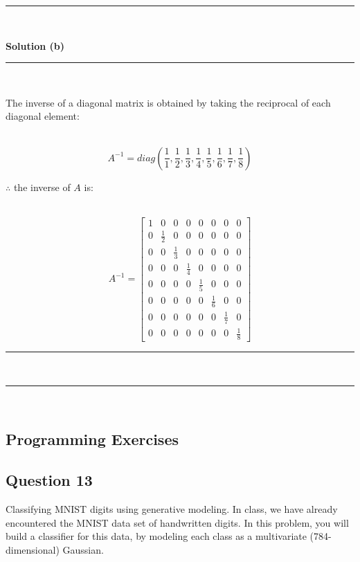 \documentclass{article}
\begin{document}
\noindent\rule{\textwidth}{0.4pt}\\
\parbox{\textwidth}{\textbf{Solution (b)}}
\noindent\rule{\textwidth}{0.4pt}\\
\parbox{\textwidth}{The inverse of a diagonal matrix is obtained by taking the reciprocal of each diagonal element:}\\
$$A^{-1} = diag\left(\frac{1}{1}, \frac{1}{2}, \frac{1}{3}, \frac{1}{4}, \frac{1}{5}, \frac{1}{6}, \frac{1}{7}, \frac{1}{8}\right)$$

\parbox{\textwidth}{$\therefore$ the inverse of $A$ is:}\\
$$A^{-1} = \begin{bmatrix}
    1 & 0 & 0 & 0 & 0 & 0 & 0 & 0 \\
    0 & \frac{1}{2} & 0 & 0 & 0 & 0 & 0 & 0 \\
    0 & 0 & \frac{1}{3} & 0 & 0 & 0 & 0 & 0 \\
    0 & 0 & 0 & \frac{1}{4} & 0 & 0 & 0 & 0 \\
    0 & 0 & 0 & 0 & \frac{1}{5} & 0 & 0 & 0 \\
    0 & 0 & 0 & 0 & 0 & \frac{1}{6} & 0 & 0 \\
    0 & 0 & 0 & 0 & 0 & 0 & \frac{1}{7} & 0 \\
    0 & 0 & 0 & 0 & 0 & 0 & 0 & \frac{1}{8}
\end{bmatrix}$$
\noindent\rule{\textwidth}{0.4pt}\\
\noindent\rule{\textwidth}{0.4pt}\\

\newpage

\subsection*{Programming Exercises}

\subsection*{Question 13}
\parbox{\textwidth}{Classifying MNIST digits using generative modeling. In class, we have already encountered the MNIST data set of handwritten digits.
In this problem, you will build a classifier for this data, by modeling each class as a multivariate (784-dimensional) Gaussian.}
\end{document}
